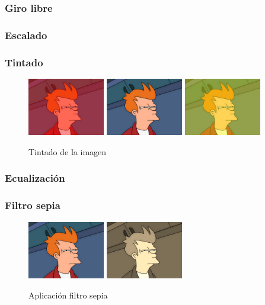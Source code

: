 \subsubsection{Giro libre}
\subsubsection{Escalado}
\subsubsection{Tintado}
\vskip0.3cm
\begin{figure}[H]
 \centering
  \includegraphics[width=0.3\textwidth]{imagenes/fryTinteRojo.jpg}
  \includegraphics[width=0.3\textwidth]{imagenes/Fry.jpg}
  \includegraphics[width=0.3\textwidth]{imagenes/fryTinteAmarillo.jpg}
 \caption{Tintado de la imagen}
 \label{diseño}
\end{figure}
\subsubsection{Ecualización}
\subsubsection{Filtro sepia}
\vskip0.3cm
\begin{figure}[H]
 \centering
  \includegraphics[width=0.3\textwidth]{imagenes/Fry.jpg}
  \includegraphics[width=0.3\textwidth]{imagenes/frySepia.jpg}
 \caption{Aplicación filtro sepia}
 \label{diseño}
\end{figure}
